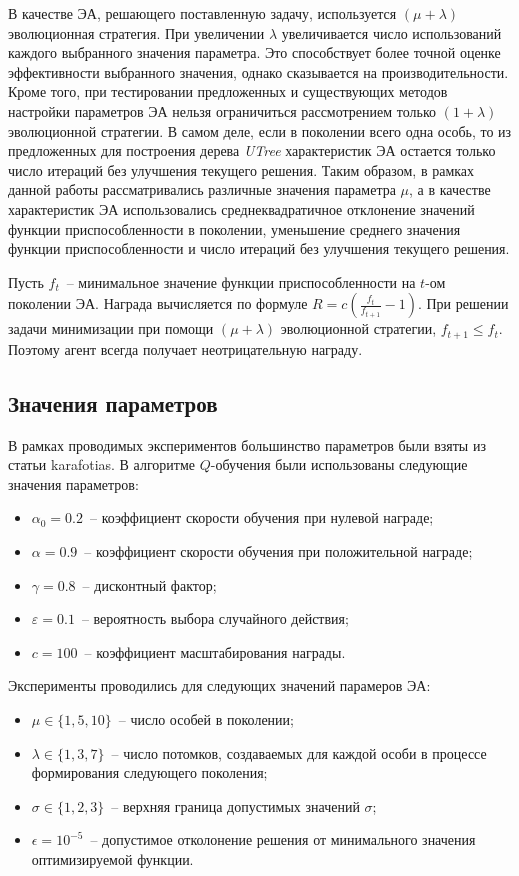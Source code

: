 В качестве ЭА, решающего поставленную задачу, используется $(\mu + \lambda)$ эволюционная стратегия. При увеличении $\lambda$ увеличивается число использований каждого выбранного значения параметра. Это способствует более точной оценке эффективности выбранного значения, однако сказывается на производительности. Кроме того, при тестировании предложенных и существующих методов настройки параметров ЭА нельзя ограничиться рассмотрением только $(1+\lambda)$ эволюционной стратегии. В самом деле, если в поколении всего одна особь, то из предложенных для построения дерева \textit{UTree} характеристик ЭА остается только число итераций без улучшения текущего решения. Таким образом, в рамках данной работы рассматривались различные значения параметра $\mu$, а в качестве характеристик ЭА использовались среднеквадратичное отклонение значений функции приспособленности в поколении, уменьшение среднего значения функции приспособленности и число итераций без улучшения текущего решения.

Пусть $f_t$~-- минимальное значение функции приспособленности на $t$-ом поколении ЭА. Награда вычисляется по формуле $R = c(\frac{f_t}{f_{t + 1}} - 1)$. При решении задачи минимизации при помощи $(\mu + \lambda)$ эволюционной стратегии, $f_{t + 1} \le f_t$. Поэтому агент всегда получает неотрицательную награду.

\subsection{Значения параметров}

В рамках проводимых экспериментов большинство параметров были взяты из статьи {karafotias}. В алгоритме $Q$-обучения были использованы следующие значения параметров:
\begin{itemize}
 \item $\alpha_0 = 0.2$~-- коэффициент скорости обучения при нулевой награде;
 \item $\alpha = 0.9$~-- коэффициент скорости обучения при положительной награде;
 \item $\gamma = 0.8$~-- дисконтный фактор;
 \item $\varepsilon = 0.1$~-- вероятность выбора случайного действия;
 \item $c = 100$~-- коэффициент масштабирования награды.
\end{itemize}

Эксперименты проводились для следующих значений парамеров ЭА:
\begin{itemize}
 \item $\mu \in \{1, 5, 10\}$~-- число особей в поколении;
 \item $\lambda \in \{1, 3, 7\}$~-- число потомков, создаваемых для каждой особи в процессе формирования следующего поколения;
 \item $\sigma \in \{1, 2, 3\}$~-- верхняя граница допустимых значений $\sigma$;
 \item $\epsilon = 10^{-5}$~-- допустимое отколонение решения от минимального значения оптимизируемой функции. 
\end{itemize}


